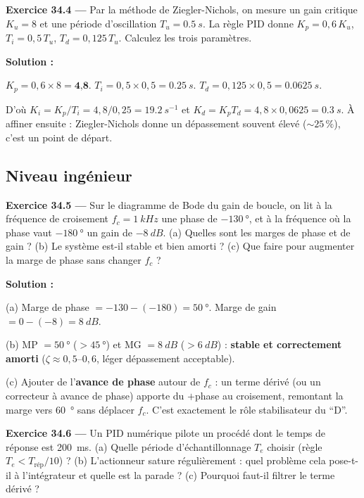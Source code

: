 \documentclass[12pt,a4paper,twoside]{book}
\begin{document}
\textbf{Exercice 34.4 ---} Par la méthode de Ziegler-Nichols, on mesure un gain critique $K_u = 8$ et une période d'oscillation $T_u = \SI{0.5}{s}$. La règle PID donne $K_p = 0{,}6\,K_u$, $T_i = 0{,}5\,T_u$, $T_d = 0{,}125\,T_u$. Calculez les trois paramètres.

\begin{pratique}
\textbf{Solution :}

$K_p = 0{,}6\times8 = \textbf{4,8}$. \quad $T_i = 0{,}5\times0{,}5 = \SI{0.25}{s}$. \quad $T_d = 0{,}125\times0{,}5 = \SI{0.0625}{s}$.

D'où $K_i = K_p/T_i = 4{,}8/0{,}25 = \SI{19.2}{s^{-1}}$ et $K_d = K_p T_d = 4{,}8\times0{,}0625 = \SI{0.3}{s}$. À affiner ensuite : Ziegler-Nichols donne un dépassement souvent élevé ($\sim 25\,\%$), c'est un point de départ.
\end{pratique}

\subsection*{Niveau ingénieur}

\textbf{Exercice 34.5 ---} Sur le diagramme de Bode du gain de boucle, on lit à la fréquence de croisement $f_c = \SI{1}{kHz}$ une phase de $-\SI{130}{°}$, et à la fréquence où la phase vaut $-\SI{180}{°}$ un gain de $-\SI{8}{dB}$. (a) Quelles sont les marges de phase et de gain ? (b) Le système est-il stable et bien amorti ? (c) Que faire pour augmenter la marge de phase sans changer $f_c$ ?

\begin{pratique}
\textbf{Solution :}

(a) Marge de phase $= -130 - (-180) = \SI{50}{°}$. Marge de gain $= 0 - (-8) = \SI{8}{dB}$.

(b) MP $= \SI{50}{°}$ ($> \SI{45}{°}$) et MG $= \SI{8}{dB}$ ($> \SI{6}{dB}$) : \textbf{stable et correctement amorti} ($\zeta \approx 0{,}5$--$0{,}6$, léger dépassement acceptable).

(c) Ajouter de l'\textbf{avance de phase} autour de $f_c$ : un terme dérivé (ou un correcteur à avance de phase) apporte du $+$phase au croisement, remontant la marge vers \SI{60}{°} sans déplacer $f_c$. C'est exactement le rôle stabilisateur du ``D''.
\end{pratique}

\textbf{Exercice 34.6 ---} Un PID numérique pilote un procédé dont le temps de réponse est \SI{200}{ms}. (a) Quelle période d'échantillonnage $T_e$ choisir (règle $T_e < T_{\text{rép}}/10$) ? (b) L'actionneur sature régulièrement : quel problème cela pose-t-il à l'intégrateur et quelle est la parade ? (c) Pourquoi faut-il filtrer le terme dérivé ?
\end{document}
